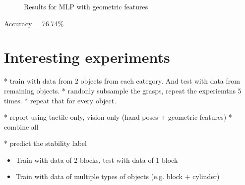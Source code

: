 \documentclass[12pt, a4paper]{report}
\theoremstyle{definition}
\begin{document}
\begin{figure}[H]%
    \centering
    \qquad
    \caption{Results for MLP with geometric features}%
    \label{fig:4.2}%
\end{figure}
Accuracy = 76.74\%


\section{Interesting experiments}
* train with data from 2 objects from each category. And test with data from remaining objects. 
* randonly subsample the grasps, repeat the experiemtns 5 times.
* repeat that for every object. 

* report using tactile only, vision only (hand poses + geometric features)
* combine all

* predict the stability label
\begin{itemize}
    \item Train with data of 2 blocks, test with data of 1 block
    \item Train with data of multiple types of objects (e.g. block + cylinder)
\end{itemize}
\end{document}
